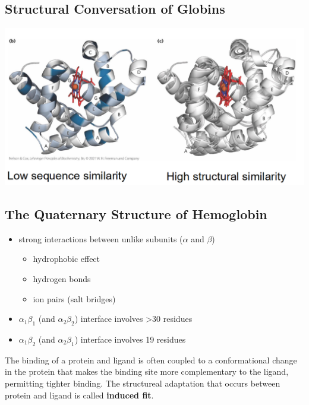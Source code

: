 \documentclass[10pt]{article}
\begin{document}
\subsection*{Structural Conversation of Globins}
\begin{center}
    \includegraphics*[width=\textwidth]{L3_4.png}
\end{center}

\subsection*{The Quaternary Structure of Hemoglobin}
\begin{itemize}
    \item strong interactions between unlike subunits ($\alpha$ and $\beta$)
    \begin{itemize}
        \item hydrophobic effect
        \item hydrogen bonds
        \item ion pairs (salt bridges)
    \end{itemize}
    \item $\alpha_1 \beta_1$ (and $\alpha_2 \beta_2$) interface involves >30 residues
    \item $\alpha_1 \beta_2$ (and $\alpha_2 \beta_1$) interface involves 19 residues
\end{itemize}
The binding of a protein and ligand is often coupled to a conformational change in the protein that makes the binding site more complementary to the ligand, permitting tighter binding.  The structureal adaptation that occurs between protein and ligand is called \textbf{induced fit}.
\end{document}
